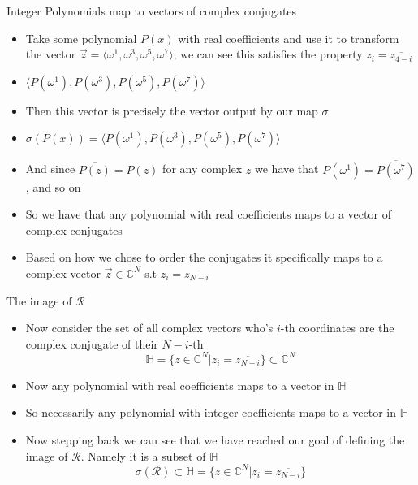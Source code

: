 \documentclass{beamer}
\begin{document}
\begin{frame}{Integer Polynomials map to vectors of complex conjugates}
	\begin{itemize}[<+->]
		\item Take some polynomial $P(x)$ with real coefficients and use it to transform the vector
		$\vec{z} = \langle \omega^1, \omega^3, \omega^5, \omega^7 \rangle$, we can see this satisfies the property $z_i = \overline{z_{4-i}}$
		\item $\langle P(\omega^1), P(\omega^3), P(\omega^5), P(\omega^7) \rangle$
		\item Then this vector is precisely the vector output by our map $\sigma$
		\item $\sigma(P(x)) = \langle P(\omega^1), P(\omega^3), P(\omega^5), P(\omega^7) \rangle$
		\item And since $\overline{P(z)} = P(\overline{z})$ for any complex $z$ we have that
		$P(\omega^1) = \overline{P(\omega^7)}$, and so on
		\item So we have that any polynomial with real coefficients maps to a vector of complex
		conjugates
		\item Based on how we chose to order the conjugates it specifically maps to
		a complex vector $\vec{z} \in \mathbb{C}^N$ s.t $z_i = \overline{z_{N-i}}$
	\end{itemize}
\end{frame}


\begin{frame}{The image of $\mathcal{R}$}
	\begin{itemize}[<+->]
		\item Now consider the set of all complex vectors who's $i$-th coordinates are the complex conjugate of their
		$N-i$-th
		\[\mathbb{H} = \{z \in \mathbb{C}^N | z_i = \overline{z_{N-i}}\} \subset \mathbb{C}^N\]
		\item Now any polynomial with real coefficients maps to a vector in $\mathbb{H}$
		\item So necessarily any polynomial with integer coefficients maps to a vector in $\mathbb{H}$
		\item Now stepping back we can see that we have reached our goal of defining the image of $\mathcal{R}$. Namely it is a subset of
		$\mathbb{H}$
		\[\sigma(\mathcal{R}) \subset \mathbb{H} = \{z \in \mathbb{C}^N | z_i = \overline{z_{N-i}}\} \]
	\end{itemize}
\end{frame}
\end{document}
